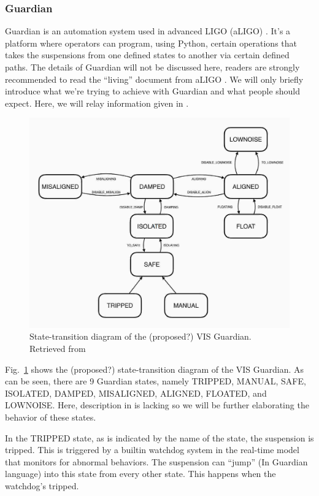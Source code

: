 \subsubsection{Guardian}
Guardian is an automation system used in advanced LIGO (aLIGO) \cite{advanced_ligo_guardian}.
It's a platform where operators can program, using Python, certain operations that takes the suspensions from one defined states to another via certain defined paths.
The details of Guardian will not be discussed here, readers are strongly recommended to read the ``living'' document from aLIGO \cite{advanced_ligo_guardian}.
We will only briefly introduce what we're trying to achieve with Guardian and what people should expect.
Here, we will relay information given in \cite{suspension_commissioning, all_of_the_vibration}.
\begin{figure}[!h]
	\centering
	\includegraphics[width=0.7\linewidth]{figures/guardian}
	\caption{State-transition diagram of the (proposed?) VIS Guardian. Retrieved from \cite{all_of_the_vibration}}
	\label{fig:guardian}
\end{figure}
Fig.~\ref{fig:guardian} shows the (proposed?) state-transition diagram of the VIS Guardian.
As can be seen, there are 9 Guardian states, namely TRIPPED, MANUAL, SAFE, ISOLATED, DAMPED, MISALIGNED, ALIGNED, FLOATED, and LOWNOISE.
Here, description in \cite{all_of_the_vibration} is lacking so we will be further elaborating the behavior of these states.

In the TRIPPED state, as is indicated by the name of the state, the suspension is tripped.
This is triggered by a builtin watchdog system in the real-time model that monitors for abnormal behaviors.
The suspension can ``jump'' (In Guardian language) into this state from every other state.
This happens when the watchdog's tripped.


